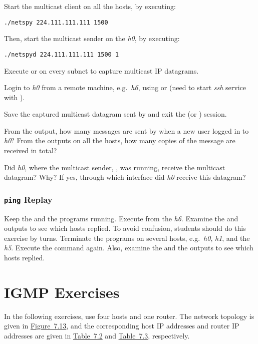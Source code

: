 \documentclass{../UTNetLab}
\begin{document}
Start the multicast client  on all the hosts, by executing:
\begin{lstlisting}
./netspy 224.111.111.111 1500
    \end{lstlisting}
Then, start the multicast sender  on the \textit{h0}, by executing:
\begin{lstlisting}
./netspyd 224.111.111.111 1500 1
    \end{lstlisting}
Execute  or  on every subnet to capture multicast IP datagrams.

Login to \textit{h0} from a remote machine, e.g.\ \textit{h6}, using  or  (need to start \textit{ssh} service with ).

Save the captured multicast datagram sent by  and exit the  (or ) session.

\begin{report}
    \item From the  output, how many messages are sent by  when a new user logged in to \textit{h0}?
    From the  outputs on all the hosts, how many copies of the message are received in total?

    \item Did \textit{h0}, where the multicast sender, , was running, receive the multicast datagram?
    Why?
    If yes, through which interface did \textit{h0} receive this datagram?
\end{report}

\section{\texttt{ping} Replay}
Keep the  and the  programs running.
Execute  from the \textit{h6}.
Examine the  and  outputs to see which hosts replied.
To avoid confusion, students should do this exercise by turns.
Terminate the  programs on several hosts, e.g.\ \textit{h0}, \textit{h1}, and the \textit{h5}.
Execute the  command again.
Also, examine the  and the  outputs to see which hosts replied.

\part{IGMP Exercises}\label{sec:igmp}
In the following exercises, use four hosts and one router.
The network topology is given in \hyperref[fig:7.13]{Figure~7.13}, and the corresponding host IP addresses and router IP addresses are given in \hyperref[tab:7.2]{Table~7.2} and \hyperref[tab:7.3]{Table~7.3}, respectively.
\end{document}
